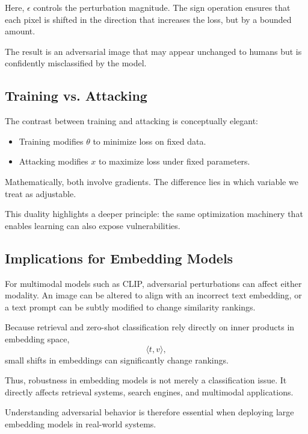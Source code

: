Here, $\epsilon$ controls the perturbation magnitude. The sign operation ensures that each pixel is shifted in the direction that increases the loss, but by a bounded amount.

The result is an adversarial image that may appear unchanged to humans but is confidently misclassified by the model.

\bigskip
\subsection{Training vs. Attacking}
\medskip

The contrast between training and attacking is conceptually elegant:

\begin{itemize}
    \item Training modifies $\theta$ to minimize loss on fixed data.
    \item Attacking modifies $x$ to maximize loss under fixed parameters.
\end{itemize}

Mathematically, both involve gradients. The difference lies in which variable we treat as adjustable.

This duality highlights a deeper principle: the same optimization machinery that enables learning can also expose vulnerabilities.

\bigskip
\subsection{Implications for Embedding Models}
\medskip

For multimodal models such as CLIP, adversarial perturbations can affect either modality. An image can be altered to align with an incorrect text embedding, or a text prompt can be subtly modified to change similarity rankings.

Because retrieval and zero-shot classification rely directly on inner products in embedding space,
\[
\langle t, v \rangle,
\]
small shifts in embeddings can significantly change rankings.

Thus, robustness in embedding models is not merely a classification issue. It directly affects retrieval systems, search engines, and multimodal applications.

Understanding adversarial behavior is therefore essential when deploying large embedding models in real-world systems.

